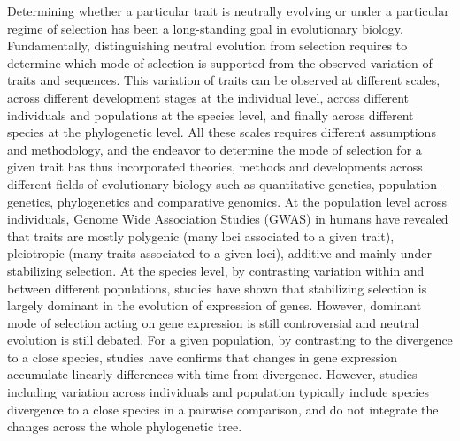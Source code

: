 \documentclass{article}
\begin{document}
Determining whether a particular trait is neutrally evolving or under a particular regime of selection has been a long-standing goal in evolutionary biology.
Fundamentally, distinguishing neutral evolution from selection requires to determine which mode of selection is supported from the observed variation of traits and sequences.
This variation of traits can be observed at different scales, across different development stages at the individual level, across different individuals and populations at the species level, and finally across different species at the phylogenetic level.
All these scales requires different assumptions and methodology, and the endeavor to determine the mode of selection for a given trait has thus incorporated theories, methods and developments across different fields of evolutionary biology such as quantitative-genetics, population-genetics, phylogenetics and comparative genomics\cite{lynch_genetics_1998, walsh_evolution_2018}.
At the population level across individuals, Genome Wide Association Studies (GWAS) in humans have revealed that traits are mostly polygenic (many loci associated to a given trait), pleiotropic (many traits associated to a given loci), additive and mainly under stabilizing selection\cite{simons_population_2018, sella_thinking_2019}.
At the species level, by contrasting variation within and between different populations, studies have shown that stabilizing selection is largely dominant in the evolution of expression of genes\cite{whitehead_neutral_2006, gilad_natural_2006, gilad_expression_2006}.
However, dominant mode of selection acting on gene expression is still controversial and neutral evolution is still debated\cite{signor_evolution_2018, price_detecting_2022}.
For a given population, by contrasting to the divergence to a close species, studies have confirms that changes in gene expression accumulate linearly differences with time from divergence\cite{khaitovich_neutral_2004}.
However, studies including variation across individuals and population typically include species divergence to a close species in a pairwise comparison, and do not integrate the changes across the whole phylogenetic tree.
\end{document}
